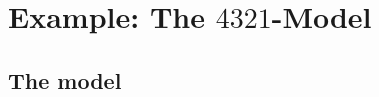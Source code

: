 \documentclass{../bredelebeamer}
\begin{document}
\section{Example: The $4321$-Model}
\subsection{The model}

\end{document}

